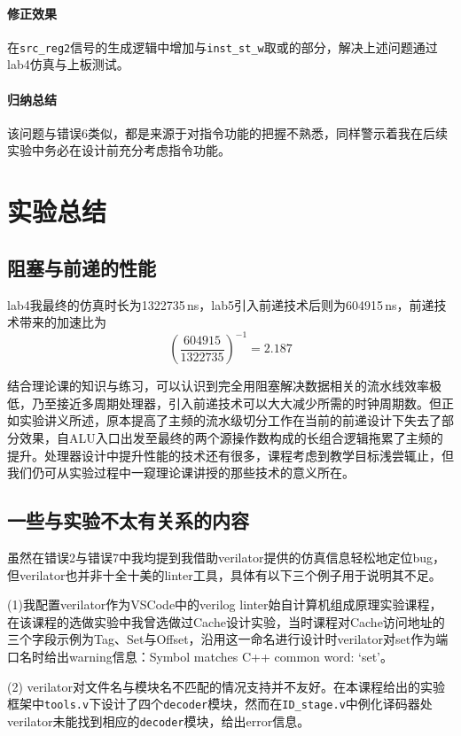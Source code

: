 \documentclass[UTF-8,twoside,c5size]{ctexart}
\begin{document}
	\paragraph{修正效果}\hfill
	
	在\texttt{src\_reg2}信号的生成逻辑中增加与\texttt{inst\_st\_w}取或的部分，解决上述问题通过lab4仿真与上板测试。
	
	\paragraph{归纳总结}\hfill
	
	该问题与错误6类似，都是来源于对指令功能的把握不熟悉，同样警示着我在后续实验中务必在设计前充分考虑指令功能。
	
	\section{实验总结}
	\subsection{阻塞与前递的性能}
	
	lab4我最终的仿真时长为1322735\,ns，lab5引入前递技术后则为604915\,ns，前递技术带来的加速比为
	\[\left(\frac{604915}{1322735}\right)^{-1}=2.187\]
	
	结合理论课的知识与练习，可以认识到完全用阻塞解决数据相关的流水线效率极低，乃至接近多周期处理器，引入前递技术可以大大减少所需的时钟周期数。但正如实验讲义所述，原本提高了主频的流水级切分工作在当前的前递设计下失去了部分效果，自ALU入口出发至最终的两个源操作数构成的长组合逻辑拖累了主频的提升。处理器设计中提升性能的技术还有很多，课程考虑到教学目标浅尝辄止，但我们仍可从实验过程中一窥理论课讲授的那些技术的意义所在。
	
	\subsection{一些与实验不太有关系的内容}
	
	虽然在错误2与错误7中我均提到我借助verilator提供的仿真信息轻松地定位bug，但verilator也并非十全十美的linter工具，具体有以下三个例子用于说明其不足。
	
	(1)我配置verilator作为VSCode中的verilog linter始自计算机组成原理实验课程，在该课程的选做实验中我曾选做过Cache设计实验，当时课程对Cache访问地址的三个字段示例为Tag、Set与Offset，沿用这一命名进行设计时verilator对set作为端口名时给出warning信息：Symbol matches C++ common word: `set'。
	
	(2) verilator对文件名与模块名不匹配的情况支持并不友好。在本课程给出的实验框架中\texttt{tools.v}下设计了四个\texttt{decoder}模块，然而在\texttt{ID\_stage.v}中例化译码器处verilator未能找到相应的\texttt{decoder}模块，给出error信息。
	
\end{document}
